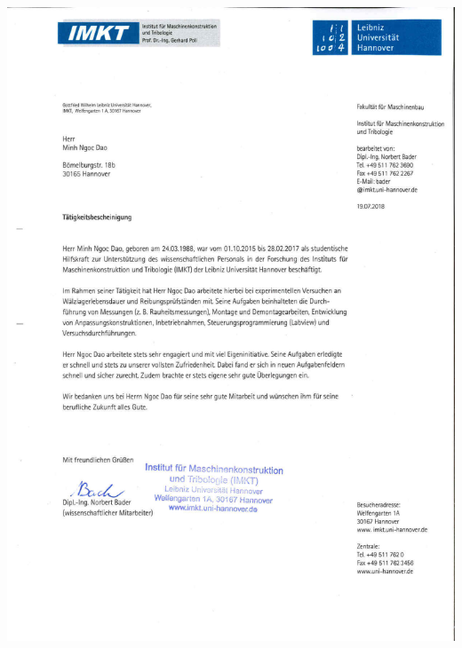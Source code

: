 \documentclass[12pt,a4paper]{scrartcl}
\begin{document}
\includegraphics[width=\linewidth, height=\textheight, keepaspectratio]
{./zeugnisse/imkt_arbeitszeugnis_lq.jpg}
\end{document}
